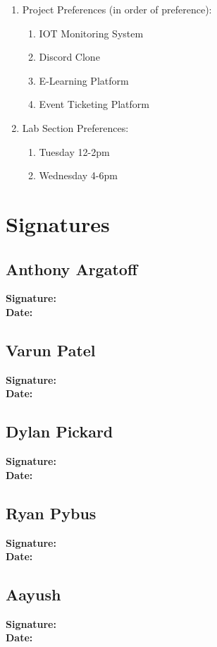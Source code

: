 \documentclass{article}
\begin{document}
\begin{enumerate}
    \item Project Preferences (in order of preference):
        \begin{enumerate}
            \item IOT Monitoring System
            \item Discord Clone
            \item E-Learning Platform
            \item Event Ticketing Platform
        \end{enumerate}
    \item Lab Section Preferences:
        \begin{enumerate}
            \item Tuesday 12-2pm
            \item Wednesday 4-6pm
        \end{enumerate}
\end{enumerate}

\pagebreak

\section*{Signatures}

\subsection*{Anthony Argatoff}
\textbf{Signature:} \\[10pt]
\textbf{Date:}

\subsection*{Varun Patel}
\textbf{Signature:} \\[10pt]
\textbf{Date:}

\subsection*{Dylan Pickard}
\textbf{Signature:} \\[10pt]
\textbf{Date:}

\subsection*{Ryan Pybus}
\textbf{Signature:} \\[10pt]
\textbf{Date:}

\subsection*{Aayush}
\textbf{Signature:} \\[10pt]
\textbf{Date:}
\end{document}
